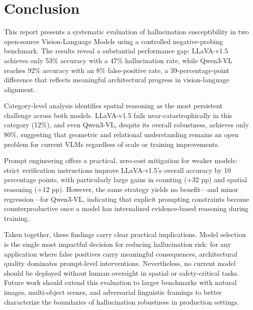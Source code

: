 \documentclass[11pt,a4paper]{article}
\begin{document}
\pagebreak

\section{Conclusion}

This report presents a systematic evaluation of hallucination susceptibility in two open-source Vision-Language Models using a controlled negative-probing benchmark. The results reveal a substantial performance gap: LLaVA-v1.5 achieves only 53\% accuracy with a 47\% hallucination rate, while Qwen3-VL reaches 92\% accuracy with an 8\% false-positive rate, a 39-percentage-point difference that reflects meaningful architectural progress in vision-language alignment.

Category-level analysis identifies spatial reasoning as the most persistent challenge across both models. LLaVA-v1.5 fails near-catastrophically in this category (12\%), and even Qwen3-VL, despite its overall robustness, achieves only 80\%, suggesting that geometric and relational understanding remains an open problem for current VLMs regardless of scale or training improvements.

Prompt engineering offers a practical, zero-cost mitigation for weaker models: strict verification instructions improve LLaVA-v1.5's overall accuracy by 10 percentage points, with particularly large gains in counting (+32 pp) and spatial reasoning (+12 pp). However, the same strategy yields no benefit---and minor regression---for Qwen3-VL, indicating that explicit prompting constraints become counterproductive once a model has internalized evidence-based reasoning during training.

Taken together, these findings carry clear practical implications. Model selection is the single most impactful decision for reducing hallucination risk: for any application where false positives carry meaningful consequences, architectural quality dominates prompt-level interventions. Nevertheless, no current model should be deployed without human oversight in spatial or safety-critical tasks. Future work should extend this evaluation to larger benchmarks with natural images, multi-object scenes, and adversarial linguistic framings to better characterize the boundaries of hallucination robustness in production settings.

\pagebreak
\end{document}
